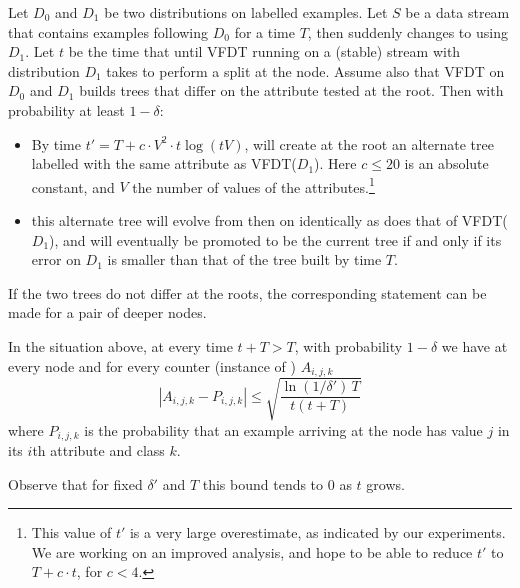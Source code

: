 \begin{theorem}
Let $D_0$ and $D_1$ be two distributions on labelled examples.
Let $S$ be a data stream that contains examples following $D_0$ for a time $T$,
then suddenly changes to using $D_1$. 
Let $t$ be the time that until VFDT running on a (stable) stream with distribution $D_1$
takes to perform a split at the node. Assume also that 
VFDT on $D_0$ and $D_1$ builds trees that differ on the attribute tested at the root. 
Then with probability at least $1-\delta$:

\begin{itemize}
\item By time $t'=T+c\cdot V^2\cdot t \log (tV)$, \HATAdwin will 
create at the root an alternate tree labelled with the same attribute 
as VFDT($D_1$). Here $c\le 20$ is an absolute constant, and $V$ the number
of values of the attributes.\footnote{This value of $t'$
is a very large overestimate, as indicated by our experiments.  
We are working on an improved analysis, and hope to be able to
reduce $t'$ to $T + c \cdot t$, for $c<4$.}
\item this alternate tree will evolve from then on identically as
does that of VFDT($D_1$), and will eventually be promoted to be the current
tree if and only if its error on $D_1$ is smaller than that of the
tree built by time $T$. 
\end{itemize}
\end{theorem}

If the two trees do not differ at the roots, the corresponding 
statement can be made for a pair of deeper nodes. 


\begin{lemma}
In the situation above, at every time $t+T>T$, with probability $1-\delta$ 
we have at every node and for every counter (instance of \adwinb) $A_{i,j,k}$
$$
|A_{i,j,k}-P_{i,j,k}| \le \sqrt{\frac{\ln(1/\delta')\,T}{t (t+T)}}
$$
where $P_{i,j,k}$ is the probability that an example arriving at the node 
has value $j$ in its $i$th attribute and class $k$. 
\end{lemma}

Observe that for fixed $\delta'$ and $T$ this bound tends to $0$ as $t$ grows.

